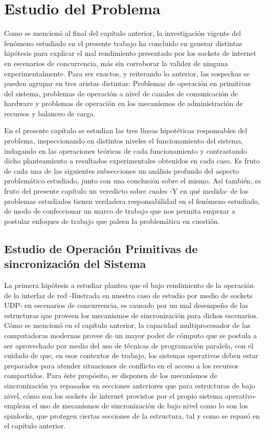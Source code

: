 \chapter{Estudio del Problema}

Como se mencionó al final del capítulo anterior, la investigación vigente del fenómeno estudiado en el presente trabajo ha concluido en generar distintas hipótesis para explicar el mal rendimiento presentado por los sockets de internet en escenarios de concurrencia, más sin corroborar la validez de ninguna experimentalmente. Para ser exactos, y reiterando lo anterior, las sospechas se pueden agrupar en tres aristas distintas: Problemas de operación en primitivas del sistema, problemas de operación a nivel de canales de comunicación de hardware y problemas de operación en los mecanísmos de administración de recursos y balanceo de carga.

En el presente capítulo se estudian las tres líneas hipotéticas responsables del problema, inspeccionando en distintos niveles el funcionamiento del sistema, indagando en las operaciones teóricas de cada funcionamiento y contrastando dicho planteamiento a resultados experimentales obtenidos en cada caso. Es fruto de cada una de las siguientes subsecciones un análisis profundo del aspecto problemático estudiado, junto con una conclusión sobre el mismo. Así también, es fruto del presente capítulo un veredicto sobre cuales -Y en qué medida- de los problemas estudiados tienen verdadera responsabilidad en el fenómeno estudiado, de modo de confeccionar un marco de trabajo que nos permita empezar a postular enfoques de trabajo que paleen la problemática en cuestión.

\section{Estudio de Operación Primitivas de sincronización del Sistema}

La primera hipótesis a estudiar plantea que el bajo rendimiento de la operación de la interfaz de red -Ilustrada en nuestro caso de estudio por medio de sockets UDP- en escenarios de concurrencia, es causado por un mal desempeño de las estructuras que proveen los mecanismos de sincronización para dichos escenarios. Cómo se mencionó en el capítulo anterior, la capacidad multiprocesador de las computadoras modernas provee de un mayor poder de cómputo que se postula a ser aprovechado por medio del uso de técnicas de programación paralela, con el cuidado de que, en esos contextos de trabajo, los sistemas operativos deben estar preparados para atender situaciones de conflicto en el acceso a los recursos compartidos. Para éste propósito, se disponen de los mecanísmos de sincronización ya repasados en secciones anteriores que para estructuras de bajo nivel, cómo son los sockets de internet provistos por el propio sistema operativo- emplean el uso de mecanísmos de sincronización de bajo nivel como lo son los spinlocks, que protegen ciertas secciones de la estructura, tal y como se repasó en el capítulo anterior.


